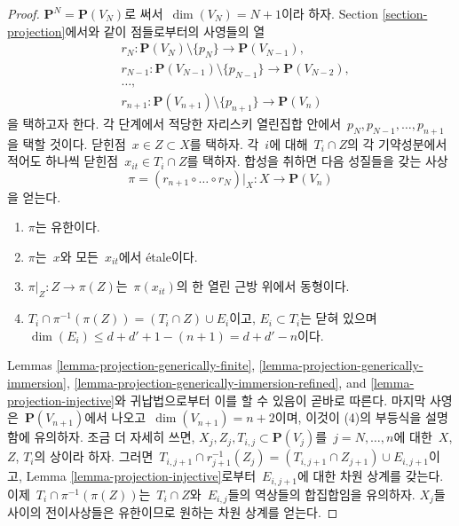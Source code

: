 \begin{proof}
$\mathbf{P}^N = \mathbf{P}(V_N)$로 써서\  $\dim(V_N) = N + 1$이라 하자.
Section \ref{section-projection}에서와 같이 점들로부터의 사영들의 열
\begin{align*}
& r_N : 
\mathbf{P}(V_N) \setminus \{p_N\} \to \mathbf{P}(V_{N - 1}), \\
& r_{N - 1} :
\mathbf{P}(V_{N - 1}) \setminus \{p_{N - 1}\} \to \mathbf{P}(V_{N - 2}), \\
& \ldots,\\
& r_{n + 1} :
\mathbf{P}(V_{n + 1}) \setminus \{p_{n + 1}\} \to \mathbf{P}(V_n)
\end{align*}
을 택하고자 한다. 각 단계에서 적당한 자리스키 열린집합 안에서\ 
$p_N, p_{N - 1}, \ldots, p_{n + 1}$을 택할 것이다.
닫힌점\  $x \in Z \subset X$를 택하자. 각\  $i$에 대해\ 
$T_i \cap Z$의 각 기약성분에서 적어도 하나씩 닫힌점\ 
$x_{it} \in T_i \cap Z$를 택하자. 합성을 취하면 다음 성질들을 갖는 사상
$$
\pi = (r_{n + 1} \circ \ldots \circ r_N)|_X :
X \longrightarrow \mathbf{P}(V_n)
$$
을 얻는다.
\begin{enumerate}
\item $\pi$는 유한이다.
\item $\pi$는\  $x$와 모든\  $x_{it}$에서 \'etale이다.
\item $\pi|_Z : Z \to \pi(Z)$는\  $\pi(x_{it})$의 한 열린 근방 위에서
동형이다.
\item $T_i \cap \pi^{-1}(\pi(Z)) = (T_i \cap Z) \cup E_i$이고,
$E_i \subset T_i$는 닫혀 있으며\ 
$\dim(E_i) \leq d + d' + 1 - (n + 1) = d + d' - n$이다.
\end{enumerate}
Lemmas \ref{lemma-projection-generically-finite},
\ref{lemma-projection-generically-immersion},
\ref{lemma-projection-generically-immersion-refined}, and
\ref{lemma-projection-injective}와 귀납법으로부터 이를 할 수 있음이
곧바로 따른다. 마지막 사영은\  $\mathbf{P}(V_{n + 1})$에서 나오고\ 
$\dim(V_{n + 1}) = n + 2$이며, 이것이 (4)의 부등식을 설명함에
유의하자. 조금 더 자세히 쓰면,
$X_j, Z_j, T_{i, j} \subset \mathbf{P}(V_j)$를\ 
$j = N, \ldots, n$에 대한\  $X$, $Z$, $T_i$의 상이라 하자. 그러면\ 
$T_{i, j + 1} \cap r_{j + 1}^{-1}(Z_j) = (T_{i, j + 1} \cap Z_{j + 1})
\cup E_{i, j + 1}$이고, Lemma \ref{lemma-projection-injective}로부터\ 
$E_{i, j + 1}$에 대한 차원 상계를 갖는다. 이제\ 
$T_i \cap \pi^{-1}(\pi(Z))$는\  $T_i \cap Z$와\  $E_{i, j}$들의
역상들의 합집합임을 유의하자. $X_j$들 사이의 전이사상들은 유한이므로
원하는 차원 상계를 얻는다.


\end{proof}
